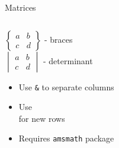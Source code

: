 \begin{frame}[fragile]{Matrices}
\begin{columns}
\begin{column}{0.5\textwidth}
\begin{center}
                $\begin{Bmatrix} a & b \\ c & d \end{Bmatrix}$ - braces\\[10pt]
                
                $\begin{vmatrix} a & b \\ c & d \end{vmatrix}$ - determinant
            \end{center}
            
            \begin{itemize}
                \item Use \texttt{\&} to separate columns
                \item Use \texttt{\\} for new rows
                \item Requires \texttt{amsmath} package
            \end{itemize}
        \end{column}
    \end{columns}
\end{frame}

